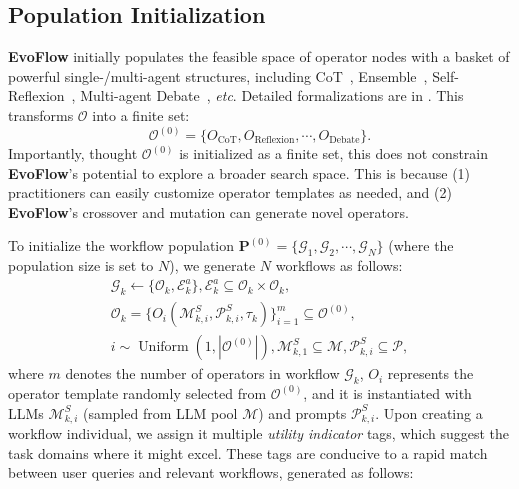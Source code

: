 \documentclass{article}
\theoremstyle{plain}
\theoremstyle{definition}
\theoremstyle{remark}
\newcommand{\ourmethod}{{\fontfamily{lmtt}\selectfont \textbf{EvoFlow}}\xspace}
\begin{document}
\subsection{Population Initialization}\label{sec:population-init}
\vspace{-0.5em}
\ourmethod initially populates the feasible space of operator nodes with a basket of powerful single-/multi-agent structures, including CoT~\cite{cot}, Ensemble~\citep{blender}, Self-Reflexion~\cite{reflexion}, Multi-agent Debate~\citep{arXiv2023_MultiAgent-Debate}, \textit{etc}. Detailed formalizations are in . This transforms $\mathcal{O}$ into a finite set:  
\begin{equation}  
\mathcal{O}^{(0)}=\{O_\text{CoT}, O_\text{Reflexion}, \cdots, O_\text{Debate}\}.  
\end{equation}  
Importantly, thought $\mathcal{O}^{(0)}$ is initialized as a finite set, this does not constrain \ourmethod's potential to explore a broader search space. This is because (1) practitioners can easily customize operator templates as needed, and (2) \ourmethod's crossover and mutation can generate novel operators. 

To initialize the workflow population $\mathbf{P}^{(0)}=\{\mathcal{G}_1, \mathcal{G}_2, \cdots, \mathcal{G}_N\}$ (where the population size is set to $N$), we generate $N$ workflows as follows:  
\begin{equation}  
\begin{gathered}  
\label{eq:init-population}
\mathcal{G}_k \leftarrow \{\mathcal{O}_k, \mathcal{E}^a_k\},  \mathcal{E}^a_k \subseteq \mathcal{O}_k \times \mathcal{O}_k, \\  
\mathcal{O}_k = \{O_i(\mathcal{M}^S_{k,i}, \mathcal{P}_{k,i}^S, \tau_k)\}_{i=1}^m \subseteq \mathcal{O}^{(0)}, \\  
i \sim \operatorname{Uniform}(1, |\mathcal{O}^{(0)}|),  \mathcal{M}_{k,1}^S \subseteq \mathcal{M}, \mathcal{P}_{k,i}^S \subseteq \mathcal{P},  
\end{gathered}  
\end{equation}  
where $m$ denotes the number of operators in workflow $\mathcal{G}_k$, $O_i$ represents the operator template randomly selected from $\mathcal{O}^{(0)}$, and it is instantiated with LLMs $\mathcal{M}_{k,i}^S$ (sampled from LLM pool $\mathcal{M}$) and prompts $\mathcal{P}_{k,i}^S$. Upon creating a workflow individual, we assign it multiple \textit{utility indicator} tags, which suggest the task domains where it might excel. These tags are conducive to a rapid match between user queries and relevant workflows, generated as follows:
\end{document}
